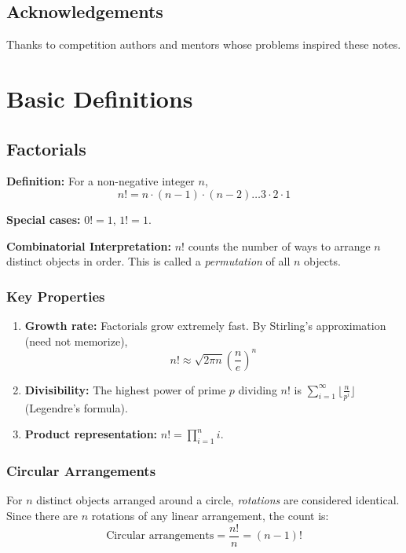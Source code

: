 \documentclass[12pt]{extarticle}
\begin{document}
\subsection*{Acknowledgements}
Thanks to competition authors and mentors whose problems inspired these notes.

\newpage

\section{Basic Definitions}

\subsection{Factorials}
\textbf{Definition:} For a non-negative integer $n$,
\[
n! = n \cdot (n-1) \cdot (n-2) \dots 3 \cdot 2 \cdot 1
\]

\textbf{Special cases:} $0! = 1$, $1! = 1$.

\textbf{Combinatorial Interpretation:} $n!$ counts the number of ways to arrange $n$ distinct objects in order. This is called a \textit{permutation} of all $n$ objects.

\subsubsection{Key Properties}

\begin{enumerate}
    \item \textbf{Growth rate:} Factorials grow extremely fast. By Stirling's approximation (need not memorize), \[ n! \approx \sqrt{2\pi n} \left(\frac{n}{e}\right)^n \]
    \item \textbf{Divisibility:} The highest power of prime $p$ dividing $n!$ is $\sum_{i=1}^{\infty} \lfloor \frac{n}{p^i} \rfloor$ (Legendre's formula).
    \item \textbf{Product representation:} $n! = \prod_{i=1}^{n} i$.
\end{enumerate}

\subsubsection{Circular Arrangements}

For $n$ distinct objects arranged around a circle, \textit{rotations} are considered identical. Since there are $n$ rotations of any linear arrangement, the count is:
\[
\text{Circular arrangements} = \frac{n!}{n} = (n-1)!
\]
\end{document}
